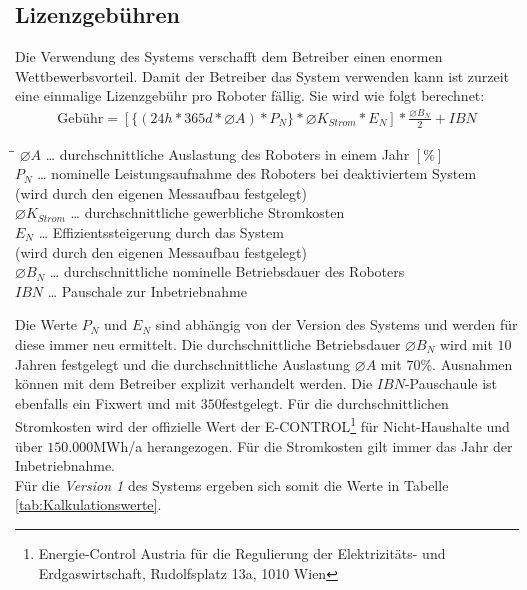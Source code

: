 \subsection{Lizenzgebühren}
Die Verwendung des Systems verschafft dem Betreiber einen enormen Wettbewerbsvorteil. Damit der Betreiber das System verwenden kann ist zurzeit eine einmalige Lizenzgebühr pro Roboter fällig. Sie wird wie folgt berechnet:\\
\begin{align*}
	\text{Gebühr} = [\{(24h * 365d * \varnothing A)*P_N\}*\varnothing K_{Strom}*E_N]*\frac{\varnothing B_N}{2} + IBN
\end{align*}
\begin{tabbing}
	\hspace{1,8cm}\=\hspace{0,6cm}\=\kill
	$\varnothing A$ \> \dots \> durchschnittliche Auslastung des Roboters in einem Jahr $[\%]$\\ 
	$P_N$\> \dots \> nominelle Leistungsaufnahme des Roboters bei deaktiviertem System\\ 
	\> \> (wird durch den eigenen Messaufbau festgelegt)\\
	$\varnothing K_{Strom}$\> \dots \> durchschnittliche gewerbliche Stromkosten\\ 
	$E_N$\> \dots \> Effizientssteigerung durch das System\\ 
	\> \> (wird durch den eigenen Messaufbau festgelegt) \\
	$\varnothing B_N$ \> \dots \> durchschnittliche nominelle Betriebsdauer des Roboters \\
	$IBN$ \> \dots \> Pauschale zur Inbetriebnahme
\end{tabbing}
Die Werte $P_N$ und $E_N$ sind abhängig von der Version des Systems und werden für diese immer neu ermittelt. Die durchschnittliche Betriebsdauer $\varnothing B_N$ wird mit $10$ Jahren festgelegt und die durchschnittliche Auslastung $\varnothing A$ mit $70$\%. Ausnahmen können mit dem Betreiber explizit verhandelt werden. Die $IBN$-Pauschaule ist ebenfalls ein Fixwert und mit $350$\officialeuro festgelegt. Für die durchschnittlichen Stromkosten wird der offizielle Wert der \textsf{E-CONTROL}\footnote{Energie-Control Austria für die Regulierung der Elektrizitäts- und Erdgaswirtschaft, Rudolfsplatz 13a, 1010 Wien} für Nicht-Haushalte und über $150.000$MWh/a herangezogen. Für die Stromkosten gilt immer das Jahr der Inbetriebnahme.\\
Für die \textit{Version 1} des Systems ergeben sich somit die Werte in Tabelle \ref{tab:Kalkulationswerte}.
